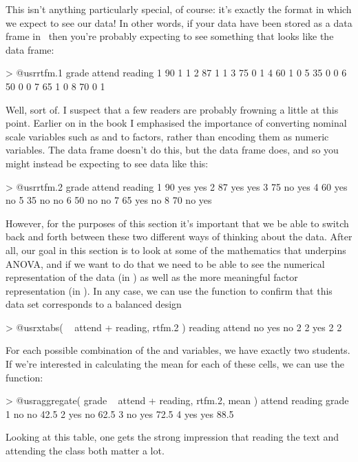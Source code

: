 \noindent
This isn't anything particularly special, of course: it's exactly the format in which we expect to see our data! In other words, if your data have been stored as a data frame in \R\ then you're probably expecting to see something that looks like the  data frame:
\begin{rblock1}
> @usr{rtfm.1}
  grade attend reading
1    90      1       1
2    87      1       1
3    75      0       1
4    60      1       0
5    35      0       0
6    50      0       0
7    65      1       0
8    70      0       1
\end{rblock1}
Well, sort of. I suspect that a few readers are probably frowning a little at this point. Earlier on in the book I emphasised the importance of converting nominal scale variables such as  and  to factors, rather than encoding them as numeric variables. The  data frame doesn't do this, but the  data frame does, and so you might instead be expecting to see data like this:
\begin{rblock1}
> @usr{rtfm.2}
  grade attend reading
1    90    yes     yes
2    87    yes     yes
3    75     no     yes
4    60    yes      no
5    35     no      no
6    50     no      no
7    65    yes      no
8    70     no     yes
\end{rblock1}
However, for the purposes of this section it's important that we be able to switch back and forth between these two different ways of thinking about the data. After all, our goal in this section is to look at some of the mathematics that underpins ANOVA, and if we want to do that we need to be able to see the numerical representation of the data (in ) as well as the more meaningful factor representation (in ). In any case, we can use the  function to confirm that this data set corresponds to a balanced design
\begin{rblock1}
> @usr{xtabs( ~ attend + reading, rtfm.2 )}
      reading
attend no yes
   no   2   2
   yes  2   2
\end{rblock1}
For each possible combination of the  and  variables, we have exactly two students. If we're interested in calculating the mean  for each of these cells, we can use the  function:
\begin{rblock1}
> @usr{aggregate( grade ~ attend + reading, rtfm.2, mean )}
  attend reading grade
1     no      no  42.5
2    yes      no  62.5
3     no     yes  72.5
4    yes     yes  88.5
\end{rblock1}
Looking at this table, one gets the strong impression that reading the text and attending the class both matter a lot. 

